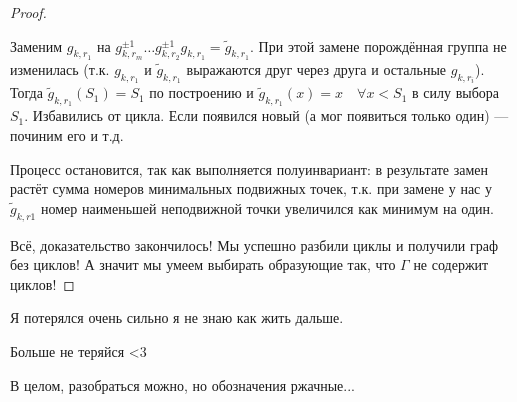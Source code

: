 \begin{proof}
\begin{enumerate}
            Заменим $g_{k,r_1}$ на $g_{k,r_m}^{\pm1} \ldots g_{k,r_2}^{\pm1} g_{k,r_1} = \widetilde{g}_{k,r_1}$. При этой замене порождённая группа не изменилась (т.к. $g_{k,r_1}$ и $\widetilde{g}_{k,r_1}$ выражаются друг через друга и остальные $g_{k,r_i}$). Тогда $\widetilde{g}_{k,r_1}(S_1) = S_1$ по построению и $\widetilde{g}_{k,r_1}(x) = x \quad \forall x < S_1$ в силу выбора $S_1$. Избавились от цикла. Если появился новый (а мог появиться только один) --- починим его и т.д.

	    Процесс остановится, так как выполняется полуинвариант: в результате замен растёт сумма номеров минимальных подвижных точек, т.к. при замене у нас у $\widetilde{g}_{k, r1}$ номер наименьшей неподвижной точки увеличился как минимум на один.
    \end{enumerate}

	    Всё, доказательство закончилось! Мы успешно разбили циклы и получили граф без циклов! А значит мы умеем выбирать образующие так, что $\Gamma$ не содержит циклов!
\end{proof}

Я потерялся очень сильно я не знаю как жить дальше.

Больше не теряйся <3

В целом, разобраться можно, но обозначения ржачные... 

